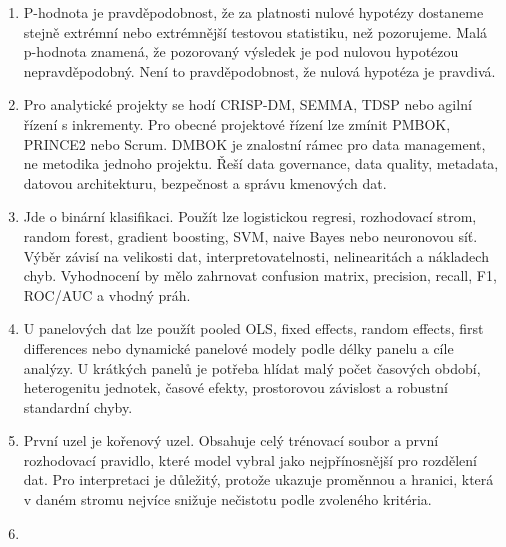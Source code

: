 \documentclass[12pt,a4paper]{article}
\begin{document}
\begin{enumerate}
  \item {}

  P-hodnota je pravděpodobnost, že za platnosti nulové hypotézy dostaneme stejně extrémní nebo
  extrémnější testovou statistiku, než pozorujeme. Malá p-hodnota znamená, že pozorovaný výsledek je
  pod nulovou hypotézou nepravděpodobný. Není to pravděpodobnost, že nulová hypotéza je pravdivá.

  \item {}

  Pro analytické projekty se hodí CRISP-DM, SEMMA, TDSP nebo agilní řízení s inkrementy. Pro obecné
  projektové řízení lze zmínit PMBOK, PRINCE2 nebo Scrum. DMBOK je znalostní rámec pro data management,
  ne metodika jednoho projektu. Řeší data governance, data quality, metadata, datovou architekturu,
  bezpečnost a správu kmenových dat.

  \item {}

  Jde o binární klasifikaci. Použít lze logistickou regresi, rozhodovací strom, random forest, gradient
  boosting, SVM, naive Bayes nebo neuronovou síť. Výběr závisí na velikosti dat, interpretovatelnosti,
  nelinearitách a nákladech chyb. Vyhodnocení by mělo zahrnovat confusion matrix, precision, recall,
  F1, ROC/AUC a vhodný práh.

  \item {}

  U panelových dat lze použít pooled OLS, fixed effects, random effects, first differences nebo
  dynamické panelové modely podle délky panelu a cíle analýzy. U krátkých panelů je potřeba hlídat
  malý počet časových období, heterogenitu jednotek, časové efekty, prostorovou závislost a robustní
  standardní chyby.

  \item {}

  První uzel je kořenový uzel. Obsahuje celý trénovací soubor a první rozhodovací pravidlo, které
  model vybral jako nejpřínosnější pro rozdělení dat. Pro interpretaci je důležitý, protože ukazuje
  proměnnou a hranici, která v daném stromu nejvíce snižuje nečistotu podle zvoleného kritéria.

  \item {}


\end{enumerate}
\end{document}
